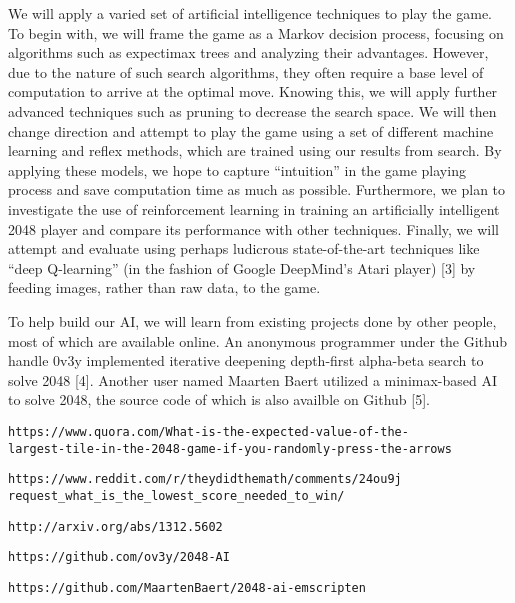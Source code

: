 \documentclass[11pt]{article}
\begin{document}
We will apply a varied set of artificial intelligence techniques to play the game. To begin with, we will frame the game as a Markov decision process, focusing on algorithms such as expectimax trees and analyzing their advantages. However, due to the nature of such search algorithms, they often require a base level of computation to arrive at the optimal move. Knowing this, we will apply further advanced techniques such as pruning to decrease the search space. We will then change direction and attempt to play the game using a set of different machine learning and reflex methods, which are trained using our results from search. By applying these models, we hope to capture “intuition” in the game playing process and save computation time as much as possible. Furthermore, we plan to investigate the use of reinforcement learning in training an artificially intelligent 2048 player and compare its performance with other techniques. Finally, we will attempt and evaluate using perhaps ludicrous state-of-the-art techniques like “deep Q-learning” (in the fashion of Google DeepMind’s Atari player) [3] by feeding images, rather than raw data, to the game.

To help build our AI, we will learn from existing projects done by other people, most of which are available online. An anonymous programmer under the Github handle 0v3y implemented iterative deepening depth-first alpha-beta search to solve 2048 [4]. Another user named Maarten Baert utilized a minimax-based AI to solve 2048, the source code of which is also availble on Github [5].

\begin{thebibliography}{9}

 \texttt{https://www.quora.com/What-is-the-expected-value-of-the-\\largest-tile-in-the-2048-game-if-you-randomly-press-the-arrows}

 \begin{verbatim}https://www.reddit.com/r/theydidthemath/comments/24ou9j
request_what_is_the_lowest_score_needed_to_win/\end{verbatim}

 \texttt{http://arxiv.org/abs/1312.5602}

 \texttt{https://github.com/ov3y/2048-AI}

 \texttt{https://github.com/MaartenBaert/2048-ai-emscripten}

\end{thebibliography}
\end{document}
